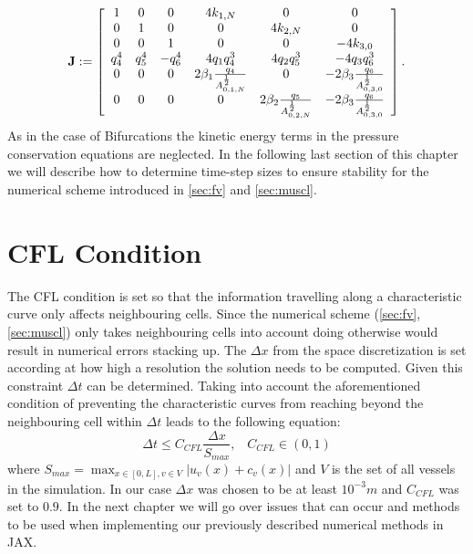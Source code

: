 \documentclass[a4paper, oneside]{discothesis}
\begin{document}
							\begin{equation}
								\mathbf{J}:=\left[\begin{array}{c c c c c c}
										1&0&0&4k_{1,N}&0&0\\
										0&1&0&0&4k_{2,N}&0\\
										0&0&1&0&0&-4k_{3,0}\\
										q_{4}^4 & q_{5}^4 & -q_{6}^4 & 4q_{1}q_{4}^3 & 4q_{2}q_{5}^3 & -4q_{3}q_{6}^3 \\
										0 & 0 & 0 & 2\beta_1\frac{q_{4}}{A_{0,1,N}^{\frac{1}{2}}} & 0 & -2\beta_3\frac{q_{6}}{A_{0,3,0}^{\frac{1}{2}}} \\
										0 & 0 & 0 & 0 & 2\beta_2\frac{q_{5}}{A_{0,2,N}^{\frac{1}{2}}} &  -2\beta_3\frac{q_{6}}{A_{0,3,0}^{\frac{1}{2}}} \\
									\end{array} 
								\right].
							\end{equation}
							As in the case of Bifurcations the kinetic energy terms in the pressure conservation equations are neglected.
							In the following last section of this chapter we will describe how to determine time-step sizes to ensure stability for the numerical scheme introduced in \autoref{sec:fv} and \autoref{sec:muscl}.

							\section{CFL Condition} \label{sec:cfl}
							The CFL condition is set so that the information travelling along a characteristic curve only affects neighbouring cells. 
							Since the numerical scheme (\autoref{sec:fv},\autoref{sec:muscl}) only takes neighbouring cells into account doing otherwise would result in numerical errors stacking up.
							The $\Delta x$ from the space discretization is set according at how high a resolution the solution needs to be computed.
							Given this constraint $\Delta t$ can be determined.
							Taking into account the aforementioned condition of preventing the characteristic curves from reaching beyond the neighbouring cell within $\Delta t$ leads to the following equation:
							\begin{equation}
								\Delta t \leq C_{CFL} \frac{\Delta x}{S_{max}},\hspace{10pt}  C_{CFL} \in (0,1)
							\end{equation}
							where $S_{max} = \max_{x \in [0,L], v \in V} | u_v(x) + c_v(x) |$ and $V$ is the set of all vessels in the simulation.  
							In our case $\Delta x$ was chosen to be at least $10^{-3}m$ and $C_{CFL}$ was set to $0.9$.
							In the next chapter we will go over issues that can occur and methods to be used when implementing our previously described numerical methods in JAX.
\end{document}
